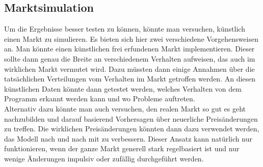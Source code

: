 \subsection{Marktsimulation}
Um die Ergebnisse besser testen zu können, könnte man versuchen, künstlich einen Markt zu simulieren. Es bieten sich hier zwei verschiedene Vorgehensweisen an. Man könnte einen künstlichen frei erfundenen Markt implementieren. Dieser sollte dann genau die Breite an verschiedenem Verhalten aufweisen, das auch im wirklichen Markt vermutet wird. Dazu müssten dann einige Annahmen über die tatsächlichen Verteilungen vom Verhalten im Markt getroffen werden. An diesen künstlichen Daten könnte dann getestet werden, welches Verhalten von dem Programm erkannt werden kann und wo Probleme auftreten.\\
Alternativ dazu könnte man auch versuchen, den realen Markt so gut es geht nachzubilden und darauf basierend Vorhersagen über neuerliche Preisänderungen zu treffen. Die wirklichen Preisänderungen könnten dann dazu verwendet werden, das Modell nach und nach mit zu verbessern. Dieser Ansatz kann natürlich nur funktionieren, wenn der ganze Markt generell stark regelbasiert ist und nur wenige Änderungen impulsiv oder zufällig durchgeführt werden. 